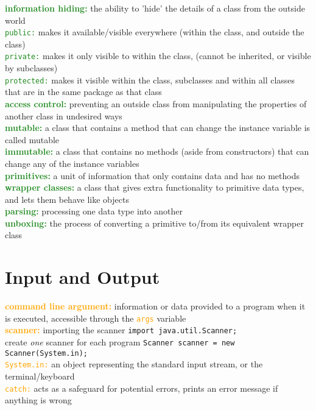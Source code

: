 \documentclass[a4paper,10pt]{article}
\begin{document}
\noindent \textcolor{ForestGreen}{\textbf{information hiding:}} the ability to 'hide' the details of a class from the outside world \\
\textcolor{ForestGreen}{\texttt{public:}} makes it available/visible everywhere (within the class, and outside the class)\\
\textcolor{ForestGreen}{\texttt{private:}} makes it only visible to within the class, (cannot be inherited, or visible by subclasses)\\
\textcolor{ForestGreen}{\texttt{protected:}} makes it visible within the class, subclasses and within all classes that are in the same package as that class \\
\textcolor{ForestGreen}{\textbf{access control:}} preventing an outside class from manipulating the properties of another class in undesired ways \\
\textcolor{ForestGreen}{\textbf{mutable:}} a class that contains a method that can change the instance variable is called mutable \\
\textcolor{ForestGreen}{\textbf{immutable:}} a class that contains no methods (aside from constructors) that can change any of the instance variables \\
\textcolor{ForestGreen}{\textbf{primitives:}} a unit of information that only contains data and has no methods \\
\textcolor{ForestGreen}{\textbf{wrapper classes:}} a class that gives extra functionality to primitive data types, and lets them behave like objects \\
\textcolor{ForestGreen}{\textbf{parsing:}} processing one data type into another \\
\textcolor{ForestGreen}{\textbf{unboxing:}} the process of converting a primitive to/from its equivalent wrapper class\\

\section{Input and Output}
\textcolor{orange}{\textbf{command line argument:}} information or data provided to a program when it is executed, accessible through the \textcolor{orange}{\texttt{args}} variable \\
\textcolor{orange}{\textbf{scanner:}} importing the scanner \texttt{import java.util.Scanner;} \\
create \emph{one} scanner for each program \texttt{Scanner scanner = new Scanner(System.in);}  \\
\textcolor{orange}{\texttt{System.in:}} an object representing the standard input stream, or the terminal/keyboard \\
\textcolor{orange}{\texttt{catch:}} acts as a safeguard for potential errors, prints an error message if anything is wrong \\
\end{document}

